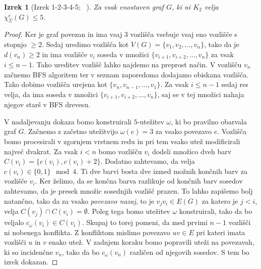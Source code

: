 \documentclass[12pt,a4paper,twoside]{article}
\theoremstyle{definition} %
\theoremstyle{plain} %
\newtheorem{izrek}[definicija]{Izrek}
\newcommand{\ec}{\chi_{\Sigma}^e}
\numberwithin{equation}{section}  %
\begin{document}
 
 \begin{izrek}[Izrek 1-2-3-4-5; ~\citet{proof12345}]
\label{theorem12345}
 	Za vsak enostaven graf $G$, ki ni $K_2$ velja $\ec(G) \le 5$.
 \end{izrek}

\begin{proof}
	Ker je graf povezan in ima vsaj 3 vozlišča vsebuje vsaj eno vozlišče s stopnjo $\ge 2$. Sedaj uredimo vozlišča kot $V(G) = \{ v_1, v_2, \ldots, v_n\}$, tako da je $d(v_n) \ge 2$ in ima vozlišče $v_i$ soseda v množici $\{v_{i+1}, v_{i+2}, \ldots, v_n\}$ za vsak $i \le n-1$. Tako ureditev vozlišč lahko najdemo na preprost način. V vozlišču $v_n$ začnemo BFS algoritem ter v seznam zaporedoma dodajamo obiskana vozlišča. Tako dobimo vozlišča urejena kot $\{v_n, v_{n-1}, \ldots, v_1\}$. Za vsak $i \le n-1$ sedaj res velja, da ima soseda v množici   $\{v_{i+1}, v_{i+2}, \ldots, v_n\}$, saj se v tej množici nahaja njegov starš v BFS drevesu.

V nadaljevanju dokaza bomo konstruirali $5$-utežitev $\omega$, ki bo pravilno obarvala graf $G$. Začnemo z začetno utežitvijo $\omega(e) = 3$ za vsako povezavo $e$. Vozlišča bomo procesirali v zgornjem vrstnem redu in pri tem vsako utež modificirali največ dvakrat. Za vsak $i < n$ bomo vozlišču $v_i$ dodeli množico dveh barv $C(v_i) = \{c(v_i), c(v_i) + 2\}$. Dodatno zahtevamo, da velja $c(v_i) \in \{0,1\}  \mod 4$. Ti dve barvi bosta dve izmed možnih končnih barv za vozlišče $v_i$. Ker želimo, da se končna barva razlikuje od končnih barv sosedov zahtevamo, da je presek množic sosednjih vozlišč prazen. To lahko zapišemo bolj natančno, tako da za vsako \textit{povezavo nazaj}, to je $v_jv_i \in E(G)$ za katero je $j < i$, velja $C(v_j) \cap C(v_i) =\emptyset$. Poleg tega bomo utežitev $\omega$ konstruirali, tako da bo veljalo $c_{\omega}(v_i) \in C(v_i)$. Skupaj to torej pomeni, da med prvimi $n-1$ vozlišči ni nobenega konflikta. Z konfliktom mislimo povezavo $uv \in E$ pri kateri imata vozlišči $u$ in $v$ enako utež. V zadnjem koraku bomo popravili uteži na povezavah, ki so incidenčne $v_n$, tako da bo $c_{\omega}(v_n)$ različen od njegovih sosedov. S tem bo izrek dokazan.


\end{proof}
\end{document}
